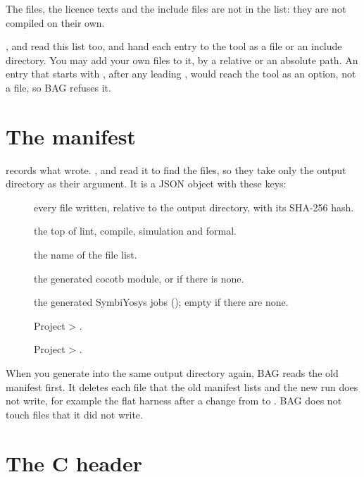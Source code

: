 

The  files, the licence texts and the include files are not in the list: they are not
compiled on their own.

,  and  read this list too, and hand each entry
to the tool as a file or an include directory. You may add your own files to it, by a
relative or an absolute path. An entry that starts with \code{-}, after any leading
, would reach the tool as an option, not a file, so BAG refuses it.

\section{The manifest}
\label{sec:manifest}

 records what  wrote. ,
 and  read it to find the files, so they take only the
output directory as their argument. It is a JSON object with these keys:

\begin{description}
\item[] every file written, relative to the output directory, with its
  SHA-256 hash.
\item[] the top of lint, compile, simulation and formal.
\item[] the name of the file list.
\item[] the generated cocotb module, or  if there is none.
\item[] the generated SymbiYosys jobs (); empty if there
  are none.
\item[] Project > .
\item[] Project > .
\end{description}

When you generate into the same output directory again, BAG reads the old manifest
first. It deletes each file that the old manifest lists and the new run does not write,
for example the flat harness after a change from  to .
BAG does not touch files that it did not write.

\section{The C header}
\label{sec:cheader}

